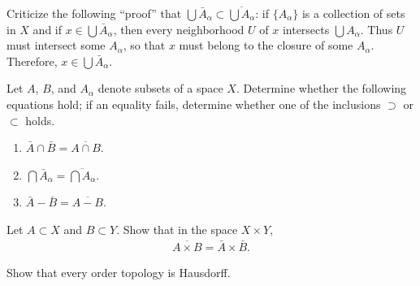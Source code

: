   \begin{exercise}[Munkres 17.7]
    Criticize the following ``proof'' that $\bigcup \bar{A}_\alpha \subset \overline{\bigcup A_\alpha}$: if $\{A_\alpha\}$ is a collection of sets in $X$ and if $x \in \bigcup \bar{A}_\alpha$, then every neighborhood $U$ of $x$ intersects $\bigcup A_\alpha$. Thus $U$ must intersect some $A_\alpha$, so that $x$ must belong to the closure of some $A_\alpha$. Therefore, $x \in \bigcup \bar{A}_\alpha$.
  \end{exercise}
  \begin{solution}
    
  \end{solution}

  \begin{exercise}[Munkres 17.8]
    Let $A$, $B$, and $A_\alpha$ denote subsets of a space $X$. Determine whether the following equations hold; if an equality fails, determine whether one of the inclusions $\supset$ or $\subset$ holds.
    \begin{enumerate}
      \item $\bar{A} \cap \bar{B} = \overline{A \cap B}$.
      \item $\bigcap \bar{A}_\alpha = \overline{\bigcap A_\alpha}$.
      \item $\bar{A} - \bar{B} = \overline{A - B}$.
    \end{enumerate}
  \end{exercise}
  \begin{solution}
    
  \end{solution}

  \begin{exercise}[Munkres 17.9]
    Let $A \subset X$ and $B \subset Y$. Show that in the space $X \times Y$,
    \begin{align*}
      \overline{A \times B} = \bar{A} \times \bar{B}.
    \end{align*}
  \end{exercise}
  \begin{solution}
    
  \end{solution}

  \begin{exercise}[Munkres 17.10]
    Show that every order topology is Hausdorff.
  \end{exercise}
  \begin{solution}
    
  \end{solution}


